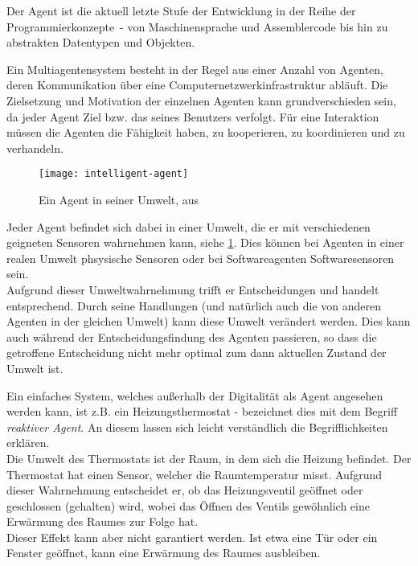 Der Agent ist die aktuell letzte Stufe der Entwicklung in der Reihe der \mbox{Programmierkonzepte -} von Maschinensprache und Assemblercode bis hin zu abstrakten Datentypen und Objekten.

Ein Multiagentensystem besteht in der Regel aus einer Anzahl von Agenten, deren Kommunikation über eine Computernetzwerkinfrastruktur abläuft.
Die Zielsetzung und Motivation der einzelnen Agenten kann grundverschieden sein, da jeder Agent  Ziel bzw. das seines Benutzers verfolgt.
Für eine Interaktion müssen die Agenten die Fähigkeit haben, zu kooperieren, zu koordinieren und zu verhandeln.

\begin{figure}[hptb]
 \centering
 \texttt{[image: intelligent-agent]}
 \caption[Ein Agent in seiner Umwelt]
 		{Ein Agent in seiner Umwelt, aus \cite{multiagent}}
 \label{figure:intelligent-agent}
\end{figure}
\noindent
Jeder Agent befindet sich dabei in einer Umwelt, die er mit verschiedenen geigneten Sensoren wahrnehmen kann, siehe \cref{figure:intelligent-agent}.
Dies können bei Agenten in einer realen Umwelt phsysische Sensoren oder bei Softwareagenten Softwaresensoren sein.
\\
Aufgrund dieser Umweltwahrnehmung trifft er Entscheidungen und handelt entsprechend.
Durch seine Handlungen (und natürlich auch die von anderen Agenten in der gleichen Umwelt) kann diese Umwelt verändert werden.
Dies kann auch während der Entscheidungsfindung des Agenten passieren, so dass die getroffene Entscheidung nicht mehr optimal zum dann aktuellen Zustand der Umwelt ist.

Ein einfaches System, welches außerhalb der Digitalität als Agent angesehen werden kann, ist z.B. ein Heizungsthermostat - \cite{artificialintelligence} bezeichnet dies mit dem Begriff \textit{reaktiver Agent}.
An diesem lassen sich leicht verständlich die Begrifflichkeiten erklären.
\\
Die Umwelt des Thermostats ist der Raum, in dem sich die Heizung befindet.
Der Thermostat hat einen Sensor, welcher die Raumtemperatur misst.
Aufgrund dieser Wahrnehmung entscheidet er, ob das Heizungsventil geöffnet oder geschlossen (gehalten) wird, wobei das Öffnen des Ventils gewöhnlich eine Erwärmung des Raumes zur Folge hat.
\\
Dieser Effekt kann aber nicht garantiert werden.
Ist etwa eine Tür oder ein Fenster geöffnet, kann eine Erwärmung des Raumes ausbleiben.

